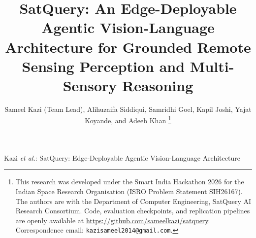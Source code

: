 \documentclass[lettersize,journal]{IEEEtran}
\begin{document}
\title{SatQuery: An Edge-Deployable Agentic Vision-Language Architecture for Grounded Remote Sensing Perception and Multi-Sensory Reasoning}

\author{Sameel Kazi (Team Lead), Alihuzaifa Siddiqui, Samridhi Goel, Kapil Joshi, Yajat Koyande, and Adeeb Khan%
\thanks{This research was developed under the Smart India Hackathon 2026 for the Indian Space Research Organisation (ISRO Problem Statement SIH26167). The authors are with the Department of Computer Engineering, SatQuery AI Research Consortium. Code, evaluation checkpoints, and replication pipelines are openly available at \url{https://github.com/sameelkazi/satquery}. Correspondence email: \texttt{kazisameel2014@gmail.com}.}}

%
{Kazi \MakeLowercase{\textit{et al.}}: SatQuery: Edge-Deployable Agentic Vision-Language Architecture}

\maketitle
\end{document}
